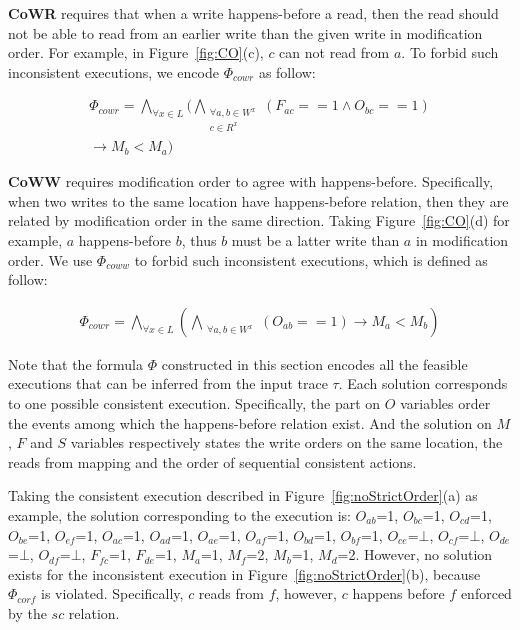 \documentclass[preprint, numbers, 10pt]{sigplanconf}
\begin{document}
\textbf{CoWR} requires that when a write happens-before a read, then the read should 
not be able to read from an earlier write than the given write in modification order. 
For example, in Figure~\ref{fig:CO}(c),
$c$ can not read from $a$. To forbid such inconsistent executions, we 
encode $\Phi_{cowr}$ as follow: 

\begin{equation}
\begin{aligned}
\Phi_{cowr} = \bigwedge_{\forall x\in L}(\bigwedge_{\substack{\forall a,b\in W^x\\c\in R^x}}
(F_{ac}==1\wedge O_{bc}==1)\\ \rightarrow M_{b}<M_{a})
\end{aligned}
\end{equation} 

\textbf{CoWW} requires modification order to agree with happens-before. 
Specifically, when two writes to the same location have happens-before relation,
then they are related by modification order in the same direction. 
Taking Figure~\ref{fig:CO}(d) for example, $a$ happens-before $b$, thus $b$ 
must be a latter write than $a$ in modification order. 
We use $\Phi_{coww}$ to forbid such inconsistent executions, which is defined 
as follow: 

\begin{equation}
\begin{aligned}
\Phi_{cowr} = \bigwedge_{\forall x\in L}(\bigwedge_{\substack{\forall a,b\in W^x}}
(O_{ab}==1)\rightarrow M_{a}<M_{b})
\end{aligned}
\end{equation} 


Note that the formula $\Phi$ constructed in this section
encodes all the feasible executions that can be inferred from the 
input trace $\tau$. 
Each solution corresponds to one possible consistent execution.
Specifically, the part on $O$ variables order the events among which 
the happens-before relation exist. And the solution on $M$, $F$ and $S$ 
variables respectively states the write orders on the same location, the reads
from mapping and the order of sequential consistent actions. 

Taking the consistent execution described in Figure~\ref{fig:noStrictOrder}(a)
as example, the solution corresponding to the execution is: 
$O_{ab}$=1, $O_{bc}$=1, $O_{cd}$=1, $O_{be}$=1, $O_{ef}$=1, $O_{ac}$=1, 
$O_{ad}$=1, $O_{ae}$=1, $O_{af}$=1, $O_{bd}$=1, $O_{bf}$=1, $O_{ce}$=$\bot$, 
$O_{cf}$=$\bot$, $O_{de}$=$\bot$, $O_{df}$=$\bot$, $F_{fc}$=1, $F_{de}$=1,
$M_a$=1, $M_f$=2, $M_b$=1, $M_d$=2. However, no solution exists for the
inconsistent execution in Figure~\ref{fig:noStrictOrder}(b), 
because $\Phi_{corf}$ is violated. Specifically, $c$ reads from $f$, 
however, $c$ happens before $f$ enforced by the $sc$ relation.
\end{document}
